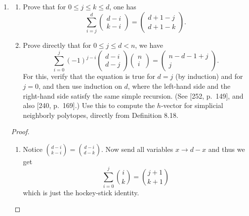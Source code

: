 \documentclass{article}
\begin{document}
\begin{enumerate}
\begin{proof}
Recall that $h(x) = f(x-1)$. Let $f = (f_{-1}, f_0, \ldots, f_d)$. Placing them along the right diagonal of the triangle, we see that the $j$'th element in the $i$'th row (where we start indexing both at $-1$, so $(-1,-1) = f_{-1} = 1)$ is equal to
\[f_{i,j} = \sum_{k=-1}^j (-1)^{j-k} \binom{i-k-1}{j-k} f_k\]
We can verify that
\[f_{i-1, j} - f_{i-1, j-1} = f_{i,j}\]

In particular with $f = (f_{-1}, f_0, \ldots, f_d)$, we have $h_{j+1} = f_{d+1, j} = \sum_{k=-1}^j (-1)^{j-k} \binom{d+k}{j-k} f_k$. For a shellable complex, all the elements in this triangle are nonnegative because all $h_i$ are positive, and since we start with nonnegative entries there cannot be any negative entries (by a simple argument).
\end{proof}

\item \begin{enumerate}[label=(\roman*)]
\item Prove that for $0\le j\le k\le d$, one has
\[
\sum_{i=j}^{d}\begin{pmatrix} d-i \\ k-i \end{pmatrix}=\begin{pmatrix} d+1-j \\ d+1-k \end{pmatrix}.
\]
\item Prove directly that for $0\le j\le d<n$, we have
\[
\sum_{i=0}^{j}(-1)^{j-i}\begin{pmatrix} d-i \\ d-j \end{pmatrix}\begin{pmatrix} n \\ i \end{pmatrix}=\begin{pmatrix} n-d-1+j \\ j \end{pmatrix}.
\]
For this, verify that the equation is true for $d=j$ (by induction) and for $j=0$, and then use induction on $d$, where the left-hand side and the right-hand side satisfy the same simple recursion. (See [252, p.~149], and also [240, p.~169].) Use this to compute the $h$-vector for simplicial neighborly polytopes, directly from Definition 8.18.
\end{enumerate}

\begin{proof}
\begin{enumerate}[label=(\roman*)]
\item Notice $\binom{d-i}{k-i} = \binom{d-i}{d-k}$. Now send all variables $x \to d-x$ and thus we get 
\[\sum_{i = 0}^j \binom{i}{k} = \binom{j+1}{k+1}\]
which is just the hockey-stick identity.


\end{enumerate}
\end{proof}
\end{enumerate}
\end{document}
